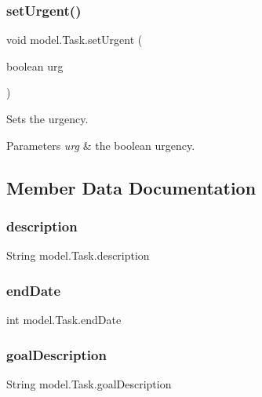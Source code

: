 \subsubsection{set\+Urgent()}
{\footnotesize\ttfamily void model.\+Task.\+set\+Urgent (\begin{DoxyParamCaption}\item[{boolean}]{urg }\end{DoxyParamCaption})\hspace{0.3cm}{\ttfamily [private]}}

Sets the urgency. 
\begin{DoxyParams}{Parameters}
{\em urg} & the boolean urgency. \\
\hline
\end{DoxyParams}


\subsection{Member Data Documentation}
\mbox{\label{classmodel_1_1_task_a07ef4f25f3f680def771f2c13cb03664}} 
\subsubsection{description}
{\footnotesize\ttfamily String model.\+Task.\+description\hspace{0.3cm}{\ttfamily [private]}}

\mbox{\label{classmodel_1_1_task_abc84aa1dba49466847cfe5ee43ec24c2}} 
\subsubsection{end\+Date}
{\footnotesize\ttfamily int model.\+Task.\+end\+Date\hspace{0.3cm}{\ttfamily [private]}}

\mbox{\label{classmodel_1_1_task_acac5f88033d284c85a01db79286f7ad5}} 
\subsubsection{goal\+Description}
{\footnotesize\ttfamily String model.\+Task.\+goal\+Description\hspace{0.3cm}{\ttfamily [private]}}

